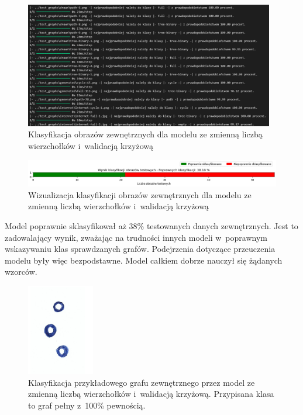 \begin{figure}[ht]
	\centering
	\includegraphics[height=5.5cm]{resources/tests/images/v3/multiple_edges_crossvalid_txt.png}
	\caption{Klasyfikacja obrazów zewnętrznych dla modelu ze zmienną liczbą wierzchołków i~walidacją krzyżową}
	\label{Fig:tests-csvar-0b}
\end{figure}
\FloatBarrier

\begin{figure}[ht]
	\centering
	\includegraphics[width=15.5cm]{resources/tests/images/v3/multiple_edges_crossvalid_bar.png}
	\caption{Wizualizacja klasyfikacji obrazów zewnętrznych dla modelu ze zmienną liczbą wierzchołków i~walidacją krzyżową}
	\label{Fig:tests-csvar-0c}
\end{figure}
\FloatBarrier

Model poprawnie sklasyfikował aż 38\% testowanych danych zewnętrznych.
Jest to zadowalający wynik, zważając na trudności innych modeli w~poprawnym wskazywaniu klas sprawdzanych grafów.
Podejrzenia dotyczące przeuczenia modelu były więc bezpodstawne.
Model całkiem dobrze nauczył się żądanych wzorców.

\begin{figure}[ht]
	\centering
	\includegraphics[height=4cm]{../graph_classification/test_graphs/drawn/empty-5.png}
	\caption{Klasyfikacja przykładowego grafu zewnętrznego przez model ze zmienną liczbą wierzchołków i~walidacją krzyżową.
		Przypisana klasa to graf pełny z~100\% pewnością.}
	\label{Fig:tests-csvar-0d}
\end{figure}
\FloatBarrier

